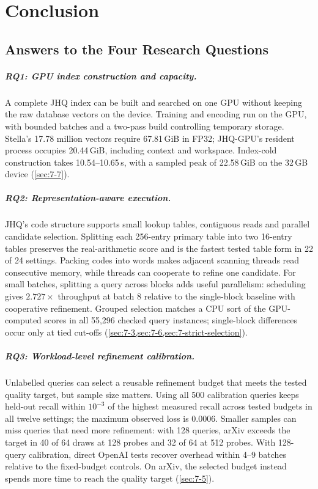\chapter{Conclusion}
\label{ch:conclusion}

\section{Answers to the Four Research Questions}
\label{sec:9-1}

\paragraph{RQ1: GPU index construction and capacity.}
A complete JHQ index can be built and searched on one GPU without keeping
the raw database vectors on the device. Training and encoding run on the
GPU, with bounded batches and a two-pass build controlling temporary
storage. Stella's 17.78 million vectors require 67.81\,GiB in FP32;
JHQ-GPU's resident process occupies 20.44\,GiB, including context and
workspace. Index-cold construction takes 10.54--10.65\,s, with a sampled peak of
22.58\,GiB on the 32\,GB device (\cref{sec:7-7}).

\paragraph{RQ2: Representation-aware execution.}
JHQ's code structure supports small lookup tables, contiguous reads and
parallel candidate selection. Splitting each 256-entry primary table
into two 16-entry tables preserves the real-arithmetic score and is the
fastest tested table form in 22 of 24 settings. Packing codes into words
makes adjacent scanning threads read consecutive memory, while threads
can cooperate to refine one candidate. For small batches, splitting a
query across blocks adds useful parallelism: scheduling gives
$2.727\times$ throughput at batch 8 relative to the single-block baseline
with cooperative refinement. Grouped selection matches a CPU sort of the
GPU-computed scores in all 55,296 checked query instances; single-block
differences occur only at tied cut-offs
(\cref{sec:7-3,sec:7-6,sec:7-strict-selection}).

\paragraph{RQ3: Workload-level refinement calibration.}
Unlabelled queries can select a reusable refinement budget that meets
the tested quality target, but sample size matters. Using all 500
calibration queries keeps held-out recall within $10^{-3}$ of the
highest measured recall across tested budgets in all twelve settings;
the maximum observed loss is 0.0006. Smaller samples can miss queries
that need more refinement: with 128 queries, arXiv exceeds the target
in 40 of 64 draws at 128 probes and 32 of 64 at 512 probes. With 128-query calibration, direct OpenAI tests recover overhead
within 4--9 batches relative to the fixed-budget controls. On arXiv, the selected budget instead
spends more time to reach the quality target (\cref{sec:7-5}).

